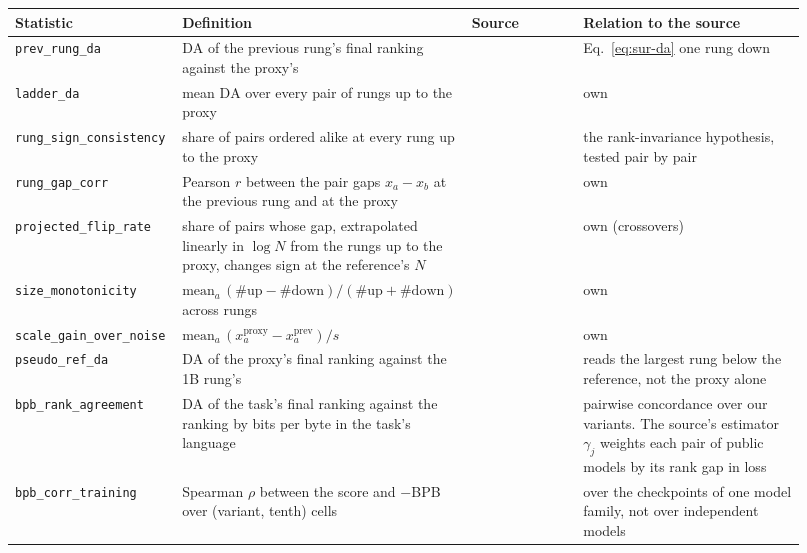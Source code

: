 \begin{table}[t]
\centering
\scriptsize
\begin{tabular}{@{}p{0.215\linewidth}p{0.28\linewidth}p{0.14\linewidth}p{0.285\linewidth}@{}}
\toprule
\textbf{Statistic} & \textbf{Definition} & \textbf{Source} & \textbf{Relation to the source} \\
\midrule
\texttt{prev\_rung\_da} & $\mathrm{DA}$ of the previous rung's final ranking against the proxy's & \citet{magnusson_datadecide_2025} & Eq.~\ref{eq:sur-da} one rung down \\
\texttt{ladder\_da} & mean $\mathrm{DA}$ over every pair of rungs up to the proxy & \citet{magnusson_datadecide_2025} & own \\
\texttt{rung\_sign\_consistency} & share of pairs ordered alike at every rung up to the proxy & \citet{liu_regmix_2025} & the rank-invariance hypothesis, tested pair by pair \\
\texttt{rung\_gap\_corr} & Pearson $r$ between the pair gaps $x_a - x_b$ at the previous rung and at the proxy & \citet{liu_regmix_2025} & own \\
\texttt{projected\_flip\_rate} & share of pairs whose gap, extrapolated linearly in $\log N$ from the rungs up to the proxy, changes sign at the reference's $N$ & \citet{magnusson_datadecide_2025} & own (crossovers) \\
\texttt{size\_monotonicity} & $\mathrm{mean}_a\,(\#\text{up} - \#\text{down})/(\#\text{up} + \#\text{down})$ across rungs & \citet{bhagia_establishing_2025} & own \\
\texttt{scale\_gain\_over\_noise} & $\mathrm{mean}_a\,(x_a^{\text{proxy}} - x_a^{\text{prev}})/s$ & \citet{bhagia_establishing_2025} & own \\
\texttt{pseudo\_ref\_da} & $\mathrm{DA}$ of the proxy's final ranking against the 1B rung's & \citet{magnusson_datadecide_2025, liu_regmix_2025} & reads the largest rung below the reference, not the proxy alone \\
\midrule
\texttt{bpb\_rank\_agreement} & $\mathrm{DA}$ of the task's final ranking against the ranking by bits per byte in the task's language & \citet{thrush_improving_2025} & pairwise concordance over our variants. The source's estimator $\gamma_j$ weights each pair of public models by its rank gap in loss \\
\texttt{bpb\_corr\_training} & Spearman $\rho$ between the score and $-$BPB over (variant, tenth) cells & \citet{thrush_improving_2025, brandfonbrener_loss--loss_2024} & over the checkpoints of one model family, not over independent models \\

\end{tabular}
\end{table}
